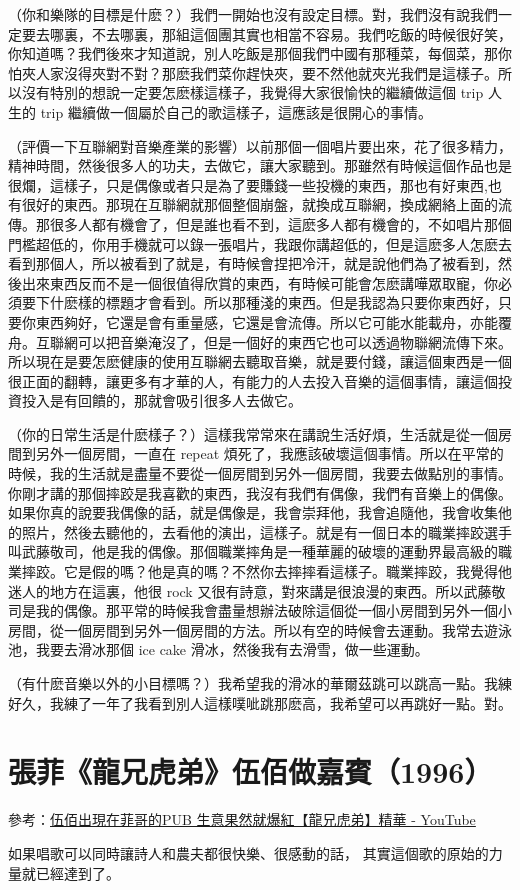 \documentclass[UTF8,a4paper,oneside,twocolumn,12pt]{ctexbook}
\begin{document}
（你和樂隊的目標是什麽？）我們一開始也沒有設定目標。對，我們沒有說我們一定要去哪裏，不去哪裏，那組這個團其實也相當不容易。我們吃飯的時候很好笑，你知道嗎？我們後來才知道說，別人吃飯是那個我們中國有那種菜，每個菜，那你怕夾人家沒得夾對不對？那麽我們菜你趕快夾，要不然他就夾光我們是這樣子。所以沒有特別的想說一定要怎麽樣這樣子，我覺得大家很愉快的繼續做這個 trip 人生的 trip 繼續做一個屬於自己的歌這樣子，這應該是很開心的事情。

（評價一下互聯網對音樂產業的影響）以前那個一個唱片要出來，花了很多精力，精神時間，然後很多人的功夫，去做它，讓大家聽到。那雖然有時候這個作品也是很爛，這樣子，只是偶像或者只是為了要賺錢一些投機的東西，那也有好東西,也有很好的東西。那現在互聯網就那個整個崩盤，就換成互聯網，換成網絡上面的流傳。那很多人都有機會了，但是誰也看不到，這麽多人都有機會的，不如唱片那個門檻超低的，你用手機就可以錄一張唱片，我跟你講超低的，但是這麽多人怎麽去看到那個人，所以被看到了就是，有時候會捏把冷汗，就是說他們為了被看到，然後出來東西反而不是一個很值得欣賞的東西，有時候可能會怎麽講嘩眾取寵，你必須要下什麽樣的標題才會看到。所以那種淺的東西。但是我認為只要你東西好，只要你東西夠好，它還是會有重量感，它還是會流傳。所以它可能水能載舟，亦能覆舟。互聯網可以把音樂淹沒了，但是一個好的東西它也可以透過物聯網流傳下來。所以現在是要怎麽健康的使用互聯網去聽取音樂，就是要付錢，讓這個東西是一個很正面的翻轉，讓更多有才華的人，有能力的人去投入音樂的這個事情，讓這個投資投入是有回饋的，那就會吸引很多人去做它。

（你的日常生活是什麽樣子？）這樣我常常來在講說生活好煩，生活就是從一個房間到另外一個房間，一直在 repeat 煩死了，我應該破壞這個事情。所以在平常的時候，我的生活就是盡量不要從一個房間到另外一個房間，我要去做點別的事情。你剛才講的那個摔跤是我喜歡的東西，我沒有我們有偶像，我們有音樂上的偶像。如果你真的說要我偶像的話，就是偶像是，我會崇拜他，我會追隨他，我會收集他的照片，然後去聽他的，去看他的演出，這樣子。就是有一個日本的職業摔跤選手叫武藤敬司，他是我的偶像。那個職業摔角是一種華麗的破壞的運動界最高級的職業摔跤。它是假的嗎？他是真的嗎？不然你去摔摔看這樣子。職業摔跤，我覺得他迷人的地方在這裏，他很 rock 又很有詩意，對來講是很浪漫的東西。所以武藤敬司是我的偶像。那平常的時候我會盡量想辦法破除這個從一個小房間到另外一個小房間，從一個房間到另外一個房間的方法。所以有空的時候會去運動。我常去遊泳池，我要去滑冰那個 ice cake 滑冰，然後我有去滑雪，做一些運動。

（有什麽音樂以外的小目標嗎？）我希望我的滑冰的華爾茲跳可以跳高一點。我練好久，我練了一年了我看到別人這樣噗呲跳那麽高，我希望可以再跳好一點。對。

\section{張菲《龍兄虎弟》伍佰做嘉賓（1996）}
參考：\href{https://www.youtube.com/watch?v=i_j0UOQOj1Q}{伍佰出現在菲哥的PUB 生意果然就爆紅【龍兄虎弟】精華 - YouTube}

如果唱歌可以同時讓詩人和農夫都很快樂、很感動的話， 其實這個歌的原始的力量就已經達到了。

\backmatter
\end{document}
